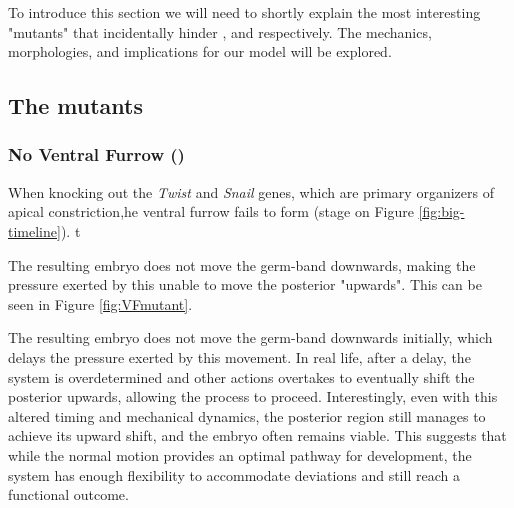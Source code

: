 To introduce this section we will need to shortly explain the most interesting "mutants" that incidentally hinder ,  and  respectively. The mechanics, morphologies, and implications for our model will be explored. 

\subsection{The mutants}


\subsubsection{No Ventral Furrow ()}
When knocking out the \textit{Twist} and \textit{Snail} genes, which are primary organizers of apical constriction,he ventral furrow fails to form (stage  on Figure \ref{fig:big-timeline}).\cite{leptin1991twist} t

The resulting embryo does not move the germ-band downwards, making the pressure exerted by this unable to move the posterior "upwards". This can be  seen in Figure \ref{fig:VFmutant}.\\


The resulting embryo does not move the germ-band downwards initially, which delays the pressure exerted by this movement. In real life, after a delay, the system is overdetermined and other actions overtakes to eventually shift the posterior upwards, allowing the process to proceed. Interestingly, even with this altered timing and mechanical dynamics, the posterior region still manages to achieve its upward shift, and the embryo often remains viable.\cite{conte2012biomechanical} This suggests that while the normal motion provides an optimal pathway for development, the system has enough flexibility to accommodate deviations and still reach a functional outcome.







